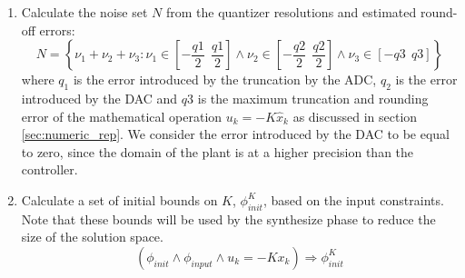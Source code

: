 \documentclass[runningheads,a4paper]{llncs}
\begin{document}
\begin{enumerate}
\begin{enumerate}
\item Calculate the noise set $N$ from the quantizer resolutions and estimated round-off errors: %
$$N=\left \{ \nu_1+\nu_2+ \nu_3 : \nu_1 \in \left[-\frac{q1}{2}\ \ \frac{q1}{2}\right] 
\wedge \nu_2 \in \left[-\frac{q2}{2}\ \ \frac{q2}{2}\right]  \wedge \nu_3 \in \left[-q3\ \ q3\right]  \right \}\nonumber$$
where  $q_1$ is the error introduced by the truncation by the ADC, $q_2$ is the error introduced by the DAC and $q3$ is the maximum truncation and rounding error of the mathematical operation $u_k=-K\hat{x}_k$ as discussed in section \ref{sec:numeric_rep}. We consider the error introduced by the DAC to be equal to zero, since the domain of the plant is at a higher precision than the controller.
\item Calculate a set of initial bounds on $K$, $\phi_{init}^{K}$, based on the input constraints. Note that these bounds will be used by the {\sc synthesize} phase to reduce the size of the solution space.
$$(\phi_{init} \wedge \phi_{input} \wedge u_k=-K x_k) \Rightarrow \phi_{init}^{K}$$


\end{enumerate}
\end{enumerate}
\end{document}
